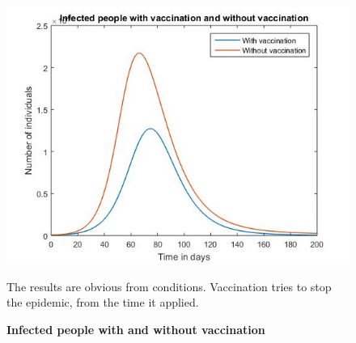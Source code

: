 \documentclass[prl,12pt,citeautoscript,reprint]{revtex4-1}
\begin{document}
\begin{figure}[H]
\begin{center}
\includegraphics[scale=0.33]{n3}
\begin{minipage}{0.45\textwidth} 
{\footnotesize  The results are obvious from conditions. Vaccination tries to stop the epidemic, from the time it applied.
\par}
\end{minipage}
 \caption{\textbf{Infected people with and without vaccination}}
  \label{fig:bn}
\end{center}
\end{figure}
\end{document}
